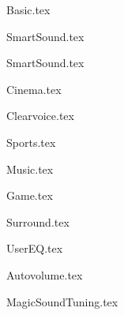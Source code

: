 {Basic.tex}

{SmartSound.tex}

{SmartSound.tex}


{Cinema.tex}

{Clearvoice.tex}

{Sports.tex}

{Music.tex}

{Game.tex}

{Surround.tex}


{UserEQ.tex}




{Autovolume.tex}

{MagicSoundTuning.tex}